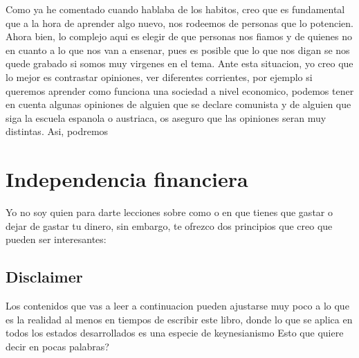 Como ya he comentado cuando hablaba de los habitos, creo que es fundamental que a la hora de aprender algo nuevo, nos rodeemos de personas que lo potencien. Ahora bien, lo complejo aqui es elegir de que personas nos fiamos y de quienes no en cuanto a lo que nos van a ensenar, pues es posible que lo que nos digan se nos quede grabado si somos muy virgenes en el tema. Ante esta situacion, yo creo que lo mejor es contrastar opiniones, ver diferentes corrientes, por ejemplo si queremos aprender como funciona una sociedad a nivel economico, podemos tener en cuenta algunas opiniones de alguien que se declare comunista y de alguien que siga la escuela espanola o austriaca, os aseguro que las opiniones seran muy distintas. Asi, podremos 
\section{Independencia financiera}

Yo no soy quien para darte lecciones sobre como o en que tienes que gastar o dejar de gastar tu dinero, sin embargo, te ofrezco dos principios que creo que pueden ser interesantes:

\subsection{Disclaimer}

Los contenidos que vas a leer a continuacion pueden ajustarse muy poco a lo que es la realidad al menos en tiempos de escribir este libro, donde lo que se aplica en todos los estados desarrollados es una especie de keynesianismo \cite{guerrero2001desempleo} Esto que quiere decir en pocas palabras?

